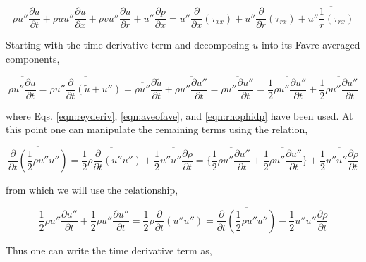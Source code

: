 \begin{equation}
	\overline{\rho u'' \frac{\partial u}{\partial t}} + \overline{\rho u u'' \frac{\partial u}{\partial x}} 
	+ \overline{\rho v u'' \frac{\partial u}{\partial r}}  + \overline{u''\frac{\partial p}{\partial x}} 
	= \overline{u''\frac{\partial}{\partial x}(\tau_{xx})} + \overline{u''\frac{\partial}{\partial r}(\tau_{rx})} 
	 + \overline{u''\frac{1}{r}(\tau_{rx})}
\label{eqn:uxmomshear}
\end{equation}

	Starting with the time derivative term and decomposing $u$ into its Favre averaged components,

\begin{displaymath}
	\overline{\rho u'' \frac{\partial u}{\partial t}} = \overline{\rho u'' \frac{\partial}{\partial t}(\tilde u
	+ u'')} = \overline{\rho u''}\frac{\partial \tilde u}{\partial t} + \overline{\rho u'' \frac{\partial u''}{\partial t}}
	= \overline{\rho u'' \frac{\partial u''}{\partial t}} = \overline{\frac{1}{2}\rho u''
	\frac{\partial u''}{\partial t}} + \overline{\frac{1}{2}\rho u''\frac{\partial u''}{\partial t}}
\end{displaymath}

	where Eqs. \ref{eqn:reyderiv}, \ref{eqn:aveofave}, and \ref{eqn:rhophidp} have been used.  At this point
one can manipulate the remaining terms using the relation,

\begin{displaymath}
	\overline{\frac{\partial}{\partial t}(\frac{1}{2}\rho u'' u'')} = \overline{\frac{1}{2}\rho\frac{\partial}{\partial t}
	(u''u'')} + \overline{\frac{1}{2}u''u''\frac{\partial \rho}{\partial t}} = \Big\{\overline{\frac{1}{2}\rho u''
	\frac{\partial u''}{\partial t}} + \overline{\frac{1}{2}\rho u''\frac{\partial u''}{\partial t}} \Big\}
	+ \overline{\frac{1}{2}u''u''\frac{\partial \rho}{\partial t}}
\end{displaymath}

	from which we will use the relationship,

\begin{displaymath}
	\overline{\frac{1}{2}\rho u''
	\frac{\partial u''}{\partial t}} + \overline{\frac{1}{2}\rho u''\frac{\partial u''}{\partial t}} = 
	\overline{\frac{1}{2}\rho\frac{\partial}{\partial t}(u''u'')} = \overline{\frac{\partial}{\partial t}
	(\frac{1}{2}\rho u'' u'')} - \overline{\frac{1}{2}u''u''\frac{\partial \rho}{\partial t}}
\end{displaymath}

	Thus one can write the time derivative term as,

